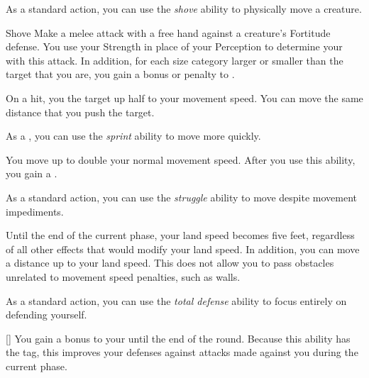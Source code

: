          As a standard action, you can use the \textit{shove} ability to physically move a creature.

        \begin{freeability}{Shove}\label{Shove}
            Make a melee attack with a free hand against a creature's Fortitude defense.
            You use your Strength in place of your Perception to determine your  with this attack.
            In addition, for each size category larger or smaller than the target that you are, you gain a  bonus or penalty to .

            On a hit, you  the target up half to your movement speed.
            You can move the same distance that you push the target.
        \end{freeability}

         As a , you can use the \textit{sprint} ability to move more quickly.

        \begin{freeability}{}
            You move up to double your normal movement speed.
            After you use this ability, you gain a .
        \end{freeability}

         As a standard action, you can use the \textit{struggle} ability to move despite movement impediments.

        \begin{freeability}{}
            Until the end of the current phase, your land speed becomes five feet, regardless of all other effects that would modify your land speed.
            In addition, you can move a distance up to your land speed.
            This does not allow you to pass obstacles unrelated to movement speed penalties, such as walls.
        \end{freeability}

         As a standard action, you can use the \textit{total defense} ability to focus entirely on defending yourself.

        \begin{freeability}{}[]
            You gain a  bonus to your  until the end of the round.
            Because this ability has the  tag, this improves your defenses against attacks made against you during the current phase.
        \end{freeability}

